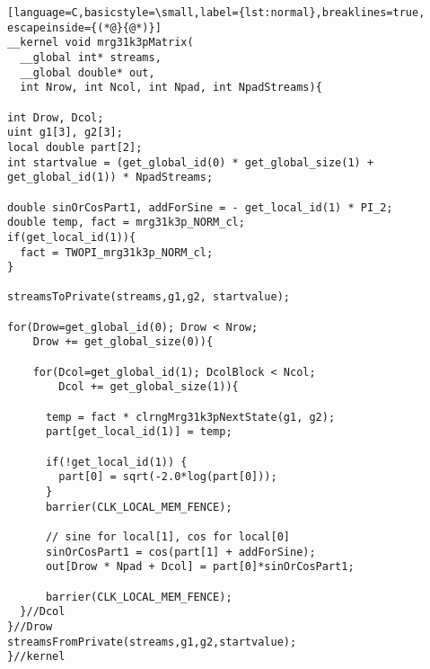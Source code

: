 \documentclass[article,nojss]{jss}\usepackage[]{graphicx}\usepackage[]{color}
\begin{document}
\begin{lstlisting}[language=C,basicstyle=\small,label={lst:normal},breaklines=true, escapeinside={(*@}{@*)}]
__kernel void mrg31k3pMatrix(
  __global int* streams,
  __global double* out,
  int Nrow, int Ncol, int Npad, int NpadStreams){

int Drow, Dcol;
uint g1[3], g2[3];
local double part[2];
int startvalue = (get_global_id(0) * get_global_size(1) + 
get_global_id(1)) * NpadStreams;

double sinOrCosPart1, addForSine = - get_local_id(1) * PI_2;
double temp, fact = mrg31k3p_NORM_cl;
if(get_local_id(1)){
  fact = TWOPI_mrg31k3p_NORM_cl;
}

streamsToPrivate(streams,g1,g2, startvalue);

for(Drow=get_global_id(0); Drow < Nrow;
    Drow += get_global_size(0)){

    for(Dcol=get_global_id(1); DcolBlock < Ncol; 
        Dcol += get_global_size(1)){
        
      temp = fact * clrngMrg31k3pNextState(g1, g2);
      part[get_local_id(1)] = temp;
      
      if(!get_local_id(1)) {
        part[0] = sqrt(-2.0*log(part[0]));
      }
      barrier(CLK_LOCAL_MEM_FENCE);
      
      // sine for local[1], cos for local[0]
      sinOrCosPart1 = cos(part[1] + addForSine);
      out[Drow * Npad + Dcol] = part[0]*sinOrCosPart1;

      barrier(CLK_LOCAL_MEM_FENCE);
  }//Dcol
}//Drow
streamsFromPrivate(streams,g1,g2,startvalue);
}//kernel
\end{lstlisting}

\end{document}
